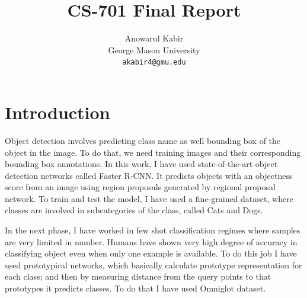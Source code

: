 \documentclass[10pt,twocolumn,letterpaper]{article}
\begin{document}
\title{CS-701 Final Report}

\author{Anowarul Kabir\\
George Mason University\\
{\tt\small akabir4@gmu.edu}
}

\maketitle
\thispagestyle{empty}


\section{Introduction}
Object detection involves predicting class name as well bounding box of the object in the image. To do that, we need training images and their corresponding bounding box annotations. In this work, I have used state-of-the-art object detection networks called Faster R-CNN\cite{NIPS2015_5638}. It predicts objects with an objectness score from an image using region proposals generated by regional proposal network. To train and test the model, I have used a fine-grained dataset, where classes are involved in subcategories of the class, called Cats and Dogs\cite{parkhi12a}.

In the next phase, I have worked in few shot classification regimes where samples are very limited in number. Humans have shown very high degree of accuracy in classifying object even when only one example is available. To do this job I have used prototypical networks\cite{DBLP:journals/corr/SnellSZ17}, which basically calculate prototype representation for each class; and then by measuring distance from the query points to that prototypes it predicts classes. To do that I have used Omniglot\cite{DBLP:journals/corr/abs-1902-03477} dataset.

\end{document}
